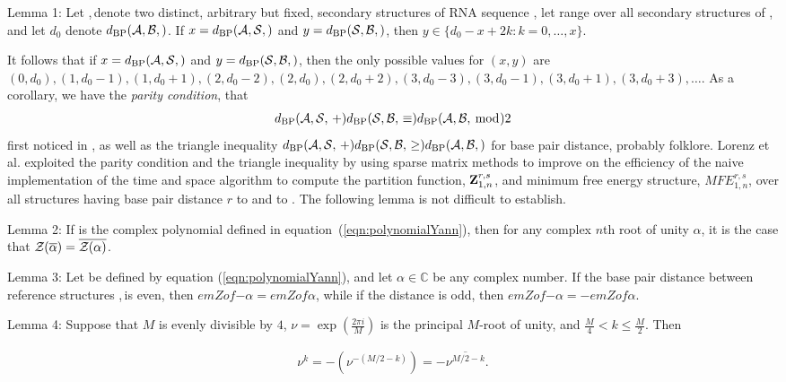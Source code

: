 \noindent
{\sc Lemma 1:} Let \strA,\,\strB denote two distinct, arbitrary but fixed,
 secondary structures of RNA sequence \seq, let \str range over
all secondary structures of \seq, and let $d_0$ denote $\dBP{\strA,\strB}$.
If $x=\dBP{\strA,\str}$ and $y=\dBP{\str,\strB}$, then
$y \in \{ d_0-x+2k: k=0,\dots,x\}$.
\medskip

\noindent
It follows that if $x=\dBP{\strA,\str}$ and $y=\dBP{\str,\strB}$,
then the only possible values for
$(x,y)$ are $(0,d_0), (1,d_0-1), (1,d_0+1),
(2,d_0-2), (2,d_0), (2, d_0+2),
(3,d_0-3), (3,d_0-1), (3, d_0+1), (3,d_0+3), \dots$.
As a corollary, we have the {\em parity condition}, that
\begin{align}
\label{eqn:parity}
\dBP{\strA,\str} + \dBP{\str,\strB} \equiv \dBP{\strA,\strB} \bmod 2
\end{align}
first noticed in \cite{hofacker:RNAbor2D}, as well as
the triangle inequality
$\dBP{\strA,\str} + \dBP{\str,\strB} \geq \dBP{\strA,\strB}$
for base pair distance, probably folklore.
Lorenz et al. \cite{hofacker:RNAbor2D} exploited the parity condition
and the triangle inequality by using sparse matrix methods to improve on
the efficiency of the naive  implementation of the
 time and  space algorithm to compute
the partition function, ${\bf Z}^{r,s}_{1,n}$,
and minimum free energy structure, $MFE^{r,s}_{1,n}$, over all
structures having base pair distance $r$ to \strA and \str to \strB.
The following lemma is not difficult to establish.
\medskip

\noindent
{\sc Lemma 2:} If \emZ{} is the complex polynomial defined in
equation~(\ref{eqn:polynomialYann}), then for any complex $n$th root of
unity $\alpha$, it is the case that ${\mathcal Z}_{}(\overline{\alpha}) =
\overline{{\mathcal Z}_{}(\alpha)}$.
\medskip

\noindent
{\sc Lemma 3:}
Let \emZ{} be defined by equation (\ref{eqn:polynomialYann}), and
let $\alpha \in \mathbb{C}$ be any complex number.
If the base pair distance between reference
structures \strA,\,\strB is even, then $emZof{}{-\alpha} = emZof{}{\alpha}$, while if
the distance is odd, then $emZof{}{-\alpha} = -emZof{}{\alpha}$.
\medskip

\noindent
{\sc Lemma 4:} Suppose that $M$ is evenly divisible by $4$,
$\nu = \exp(\frac{2 \pi i}{M})$ is the principal $M$-root of unity, and
$\frac{M}{4} < k \leq \frac{M}{2}$. Then

\begin{align}
\nu^k = -(\nu^{-(M/2-k)}) = - \overline{\nu^{M/2-k}}.
\end{align}
\medskip


